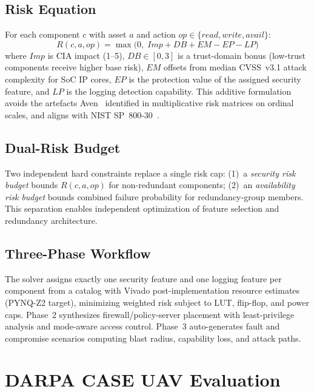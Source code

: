 \documentclass[conference]{IEEEtran}
\begin{document}
\subsection{Risk Equation}
For each component $c$ with asset $a$ and action
$\mathit{op} \in \{\mathit{read}, \mathit{write}, \mathit{avail}\}$:
\begin{equation}
R(c,a,\mathit{op}) = \max\!\bigl(0,\;\mathit{Imp}+\mathit{DB}+\mathit{EM}
  -\mathit{EP}-\mathit{LP}\bigr)
\label{eq:risk}
\end{equation}
where $\mathit{Imp}$ is CIA impact (1--5), $\mathit{DB}\in[0,3]$ is a
trust-domain bonus (low-trust components receive higher base risk),
$\mathit{EM}$ offsets from median CVSS~v3.1 attack complexity for SoC IP
cores, $\mathit{EP}$ is the protection value of the assigned security
feature, and $\mathit{LP}$ is the logging detection capability. This
additive formulation avoids the artefacts Aven~\cite{aven_riskmatrix}
identified in multiplicative risk matrices on ordinal scales, and aligns
with NIST SP~800-30~\cite{nist_sp80030}.

\subsection{Dual-Risk Budget}
Two independent hard constraints replace a single risk cap:
(1)~a \emph{security risk budget} bounds $R(c,a,\mathit{op})$ for
non-redundant components; (2)~an \emph{availability risk budget} bounds
combined failure probability for redundancy-group members. This
separation enables independent optimization of feature selection and
redundancy architecture.

\subsection{Three-Phase Workflow}
The solver assigns exactly one security feature and one logging feature
per component from a catalog with Vivado post-implementation resource
estimates (PYNQ-Z2 target), minimizing weighted risk subject to LUT,
flip-flop, and power caps. Phase~2 synthesizes firewall/policy-server
placement with least-privilege analysis and mode-aware access control.
Phase~3 auto-generates fault and compromise scenarios computing
blast radius, capability loss, and attack paths.

\section{DARPA CASE UAV Evaluation}
\end{document}
